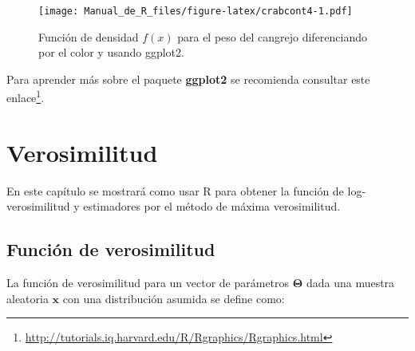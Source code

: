 \documentclass[10pt,]{krantz}
\makeatletter
\newenvironment{Shaded}{\begin{snugshade}}{\end{snugshade}}
\newcommand{\KeywordTok}[1]{\textcolor[rgb]{0.13,0.29,0.53}{\textbf{#1}}}
\newcommand{\DataTypeTok}[1]{\textcolor[rgb]{0.13,0.29,0.53}{#1}}
\newcommand{\DecValTok}[1]{\textcolor[rgb]{0.00,0.00,0.81}{#1}}
\newcommand{\FloatTok}[1]{\textcolor[rgb]{0.00,0.00,0.81}{#1}}
\newcommand{\StringTok}[1]{\textcolor[rgb]{0.31,0.60,0.02}{#1}}
\newcommand{\CommentTok}[1]{\textcolor[rgb]{0.56,0.35,0.01}{\textit{#1}}}
\newcommand{\OperatorTok}[1]{\textcolor[rgb]{0.81,0.36,0.00}{\textbf{#1}}}
\newcommand{\NormalTok}[1]{#1}
\let\proglang=\textsf
\renewcommand{\href}[2]{#2\footnote{\url{#1}}}
\newenvironment{kframe}{%
\medskip{}
\setlength{\fboxsep}{.8em}
 \def\at@end@of@kframe{}%
 \ifinner\ifhmode%
  \def\at@end@of@kframe{\end{minipage}}%
  \begin{minipage}{\columnwidth}%
 \fi\fi%
 \def\FrameCommand##1{\hskip\@totalleftmargin \hskip-\fboxsep
 \colorbox{shadecolor}{##1}\hskip-\fboxsep
     \hskip-\linewidth \hskip-\@totalleftmargin \hskip\columnwidth}%
 \MakeFramed {\advance\hsize-\width
   \@totalleftmargin\z@ \linewidth\hsize
   \@setminipage}}%
 {\par\unskip\endMakeFramed%
 \at@end@of@kframe}
\renewenvironment{Shaded}{\begin{kframe}}{\end{kframe}}
\makeatother
\begin{document}
\begin{Shaded}
\end{Shaded}

\begin{figure}
\centering
\texttt{[image: Manual\_de\_R\_files/figure-latex/crabcont4-1.pdf]}
\caption{\label{fig:crabcont4}Función de densidad \(f(x)\) para el peso del
cangrejo diferenciando por el color y usando ggplot2.}
\end{figure}

Para aprender más sobre el paquete \textbf{ggplot2} se recomienda
consultar este
\href{http://tutorials.iq.harvard.edu/R/Rgraphics/Rgraphics.html}{enlace}.

\chapter{\texorpdfstring{Verosimilitud
\label{loglik}}{Verosimilitud }}\label{verosimilitud}

En este capítulo se mostrará como usar \proglang{R} para obtener la
función de log-verosimilitud y estimadores por el método de máxima
verosimilitud.

\section{Función de verosimilitud}\label{funcion-de-verosimilitud}

La función de verosimilitud para un vector de parámetros
\(\boldsymbol{\Theta}\) dada una muestra aleatoria \(\boldsymbol{x}\)
con una distribución asumida se define como:
\end{document}
